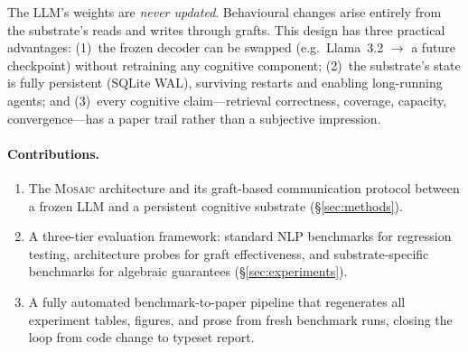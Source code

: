 The LLM's weights are \emph{never updated}.  Behavioural changes arise entirely
from the substrate's reads and writes through grafts.  This design has three
practical advantages: (1)~the frozen decoder can be swapped (e.g.\ Llama~3.2
$\to$ a future checkpoint) without retraining any cognitive component;
(2)~the substrate's state is fully persistent (SQLite WAL), surviving restarts
and enabling long-running agents; and (3)~every cognitive claim---retrieval
correctness, coverage, capacity, convergence---has a paper trail rather than a subjective impression.

\paragraph{Contributions.}
\begin{enumerate}[nosep]
  \item The \textsc{Mosaic} architecture and its graft-based communication
    protocol between a frozen LLM and a persistent cognitive substrate
    (\S\ref{sec:methods}).
  \item A three-tier evaluation framework: standard NLP benchmarks for
    regression testing, architecture probes for graft effectiveness, and
    substrate-specific benchmarks for algebraic guarantees
    (\S\ref{sec:experiments}).
  \item A fully automated benchmark-to-paper pipeline that regenerates all
    experiment tables, figures, and prose from fresh benchmark runs, closing
    the loop from code change to typeset report.
\end{enumerate}
